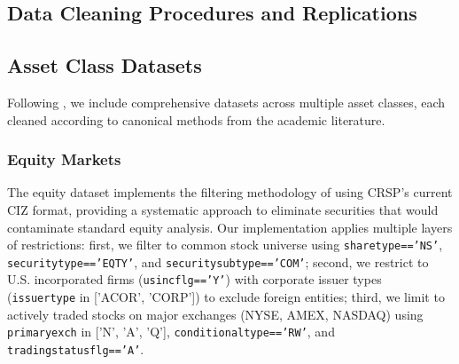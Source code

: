 \documentclass{article}
\begin{document}






\begin{appendices}

\section{Data Cleaning Procedures and Replications}
\label{app:data_cleaning_and_replications}

\subsection{Asset Class Datasets}
\label{sec:asset_classes}


Following \cite{He2017}, we include comprehensive datasets across multiple asset classes, each cleaned according to canonical methods from the academic literature.

\subsubsection{Equity Markets}
\label{sec:equity}

The equity dataset implements the filtering methodology of \cite{Fama1993} using CRSP's current CIZ format, providing a systematic approach to eliminate securities that would contaminate standard equity analysis. Our implementation applies multiple layers of restrictions: first, we filter to common stock universe using \texttt{sharetype=='NS'}, \texttt{securitytype=='EQTY'}, and \texttt{securitysubtype=='COM'}; second, we restrict to U.S. incorporated firms (\texttt{usincflg=='Y'}) with corporate issuer types (\texttt{issuertype} in ['ACOR', 'CORP']) to exclude foreign entities; third, we limit to actively traded stocks on major exchanges (NYSE, AMEX, NASDAQ) using \texttt{primaryexch} in ['N', 'A', 'Q'], \texttt{conditionaltype=='RW'}, and \texttt{tradingstatusflg=='A'}. 


\end{appendices}
\end{document}
